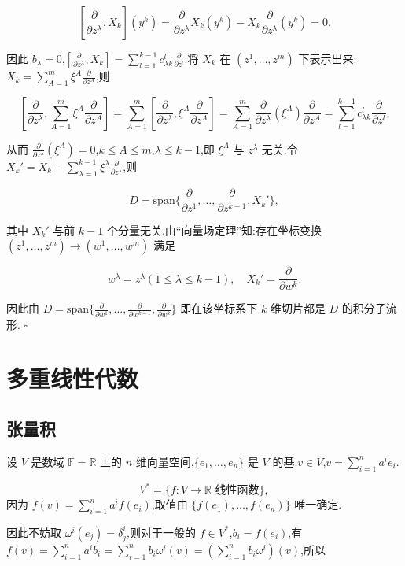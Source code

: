 \[
[\frac{\partial}{\partial z^\lambda}, X_k](y^k) = \frac{\partial}{\partial z^\lambda} X_k(y^k) - X_k \frac{\partial}{\partial z^\lambda} (y^k) = 0.
\]

因此 $b_\lambda = 0$,$[\frac{\partial}{\partial z^\lambda}, X_k] = \sum_{l=1}^{k-1} c_{\lambda k}^l \frac{\partial}{\partial z^l}$.将 $X_k$ 在 $(z^1, \ldots, z^m)$ 下表示出来:$X_k = \sum_{A=1}^m \xi^A \frac{\partial}{\partial z^A}$,则

\[
[\frac{\partial}{\partial z^\lambda}, \sum_{A=1}^m \xi^A \frac{\partial}{\partial z^A}] = \sum_{A=1}^m [\frac{\partial}{\partial z^\lambda}, \xi^A \frac{\partial}{\partial z^A}] = \sum_{A=1}^m \frac{\partial}{\partial z^\lambda} (\xi^A) \frac{\partial}{\partial z^A} = \sum_{l=1}^{k-1} c_{\lambda k}^l \frac{\partial}{\partial z^l}.
\]

从而 $\frac{\partial}{\partial z^\lambda} (\xi^A) = 0$,$k \leq A \leq m$,$\lambda \leq k-1$,即 $\xi^A$ 与 $z^\lambda$ 无关.令 $X_k' = X_k - \sum_{\lambda=1}^{k-1} \xi^\lambda \frac{\partial}{\partial z^\lambda}$,则

\[
D = \text{span} \{ \frac{\partial}{\partial z^1}, \ldots, \frac{\partial}{\partial z^{k-1}}, X_k' \},
\]

其中 $X_k'$ 与前 $k-1$ 个分量无关.由“向量场定理”知:存在坐标变换 $(z^1, \ldots, z^m) \rightarrow (w^1, \ldots, w^m)$ 满足

\[
w^\lambda = z^\lambda (1 \leq \lambda \leq k-1), \quad X_k' = \frac{\partial}{\partial w^k}.
\]

因此由 $D = \text{span} \{ \frac{\partial}{\partial w^1}, \ldots, \frac{\partial}{\partial w^{k-1}}, \frac{\partial}{\partial w^k} \}$ 即在该坐标系下 $k$ 维切片都是 $D$ 的积分子流形. $\square$

\section{多重线性代数}

\subsection{张量积}

设 $V$ 是数域 $\mathbb{F} = \mathbb{R}$ 上的 $n$ 维向量空间,$\{e_1, \ldots, e_n\}$ 是 $V$ 的基.$v \in V$,$v = \sum_{i=1}^n a^i e_i$.

\[
V^* = \{f : V \to \mathbb{R} \text{ 线性函数} \},
\]
因为 $f(v) = \sum_{i=1}^n a^if(e_i)$,取值由 $\{f(e_1), \ldots, f(e_n)\}$ 唯一确定.

因此不妨取 $\omega^i(e_j) = \delta_j^i$,则对于一般的 $f \in V^*$,$b_i = f(e_i)$,有 $f(v) = \sum_{i=1}^n a^ib_i = \sum_{i=1}^n b_i \omega^i(v) = (\sum_{i=1}^n b_i \omega^i)(v)$,所以


